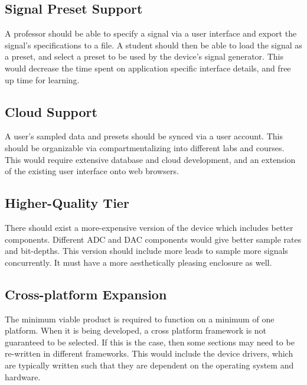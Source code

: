 \documentclass[letterpaper,12pt]{article}
\begin{document}
\subsection{Signal Preset Support}

A professor should be able to specify a signal via a user interface and export
the signal's specifications to a file. A student should then be able to load the
signal as a preset, and select a preset to be used by the device's signal
generator. This would decrease the time spent on application specific interface
details, and free up time for learning.

\subsection{Cloud Support}

A user's sampled data and presets should be synced via a user account. This
should be organizable via compartmentalizing into different labs and courses.
This would require extensive database and cloud development, and an extension of
the existing user interface onto web browsers. 

\subsection{Higher-Quality Tier}

There should exist a more-expensive version of the device which includes better
components. Different ADC and DAC components would give better sample rates and
bit-depths. This version should include more leads to sample more signals
concurrently. It must have a more aesthetically pleasing enclosure as well.

\subsection{Cross-platform Expansion}

The minimum viable product is required to function on a minimum of one platform.
When it is being developed, a cross platform framework is not guaranteed to be
selected. If this is the case, then some sections may need to be re-written in
different frameworks. This would include the device drivers, which are typically
written such that they are dependent on the operating system and hardware.

\newpage


\end{document}
